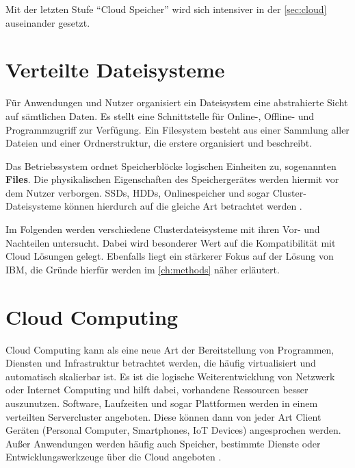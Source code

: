 Mit der letzten Stufe ``Cloud Speicher'' wird sich intensiver in der \autoref{sec:cloud} auseinander gesetzt.



\newpage

\section{Verteilte Dateisysteme} \label{sec:filesystems}

Für Anwendungen und Nutzer organisiert ein Dateisystem eine abstrahierte Sicht auf sämtlichen Daten. Es stellt eine Schnittstelle für Online-, Offline- und Programmzugriff zur Verfügung. Ein Filesystem besteht aus einer Sammlung aller Dateien und einer Ordnerstruktur, die erstere organisiert und beschreibt. 

Das Betriebssystem ordnet Speicherblöcke logischen Einheiten zu, sogenannten \textbf{Files}. Die physikalischen Eigenschaften des Speichergerätes werden hiermit vor dem Nutzer verborgen. SSDs, HDDs, Onlinespeicher und sogar Cluster-Dateisysteme können hierdurch auf die gleiche Art betrachtet werden \parencite{silberschatz.2012}.

Im Folgenden werden verschiedene Clusterdateisysteme mit ihren Vor- und Nachteilen untersucht. Dabei wird besonderer Wert auf die Kompatibilität mit Cloud Lösungen gelegt. Ebenfalls liegt ein stärkerer Fokus auf der Lösung von IBM, die Gründe hierfür werden im \autoref{ch:methods} näher erläutert.



\section{Cloud Computing}\label{sec:cloud}

Cloud Computing kann als eine neue Art der Bereitstellung von Programmen, Diensten und Infrastruktur betrachtet werden, die häufig virtualisiert und automatisch skalierbar ist. Es ist die logische Weiterentwicklung von Netzwerk oder Internet Computing und hilft dabei, vorhandene Ressourcen besser auszunutzen. 
Software, Laufzeiten und sogar Plattformen werden in einem verteilten Servercluster angeboten. Diese können dann von jeder Art  Client Geräten (Personal Computer, Smartphones, \ac{IoT} Devices) angesprochen werden. Außer Anwendungen werden häufig  auch Speicher, bestimmte Dienste oder Entwicklungswerkzeuge über die Cloud angeboten \parencite[S. 3]{furth.2010}.


